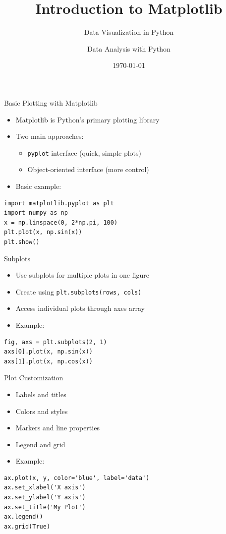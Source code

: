 \documentclass{beamer}
\title{Introduction to Matplotlib}
\subtitle{Data Visualization in Python}
\author{Data Analysis with Python}
\date{\today}
\begin{document}
\begin{frame}
    \titlepage
\end{frame}

\begin{frame}[fragile]{Basic Plotting with Matplotlib}
    \begin{itemize}
        \item Matplotlib is Python's primary plotting library
        \item Two main approaches:
        \begin{itemize}
            \item \texttt{pyplot} interface (quick, simple plots)
            \item Object-oriented interface (more control)
        \end{itemize}
        \item Basic example:
    \end{itemize}
\begin{lstlisting}
import matplotlib.pyplot as plt
import numpy as np
x = np.linspace(0, 2*np.pi, 100)
plt.plot(x, np.sin(x))
plt.show()
\end{lstlisting}
\end{frame}

\begin{frame}[fragile]{Subplots}
    \begin{itemize}
        \item Use subplots for multiple plots in one figure
        \item Create using \texttt{plt.subplots(rows, cols)}
        \item Access individual plots through axes array
        \item Example:
    \end{itemize}
\begin{lstlisting}
fig, axs = plt.subplots(2, 1)
axs[0].plot(x, np.sin(x))
axs[1].plot(x, np.cos(x))
\end{lstlisting}
\end{frame}

\begin{frame}[fragile]{Plot Customization}
    \begin{itemize}
        \item Labels and titles
        \item Colors and styles
        \item Markers and line properties
        \item Legend and grid
        \item Example:
    \end{itemize}

\begin{lstlisting}
ax.plot(x, y, color='blue', label='data')
ax.set_xlabel('X axis')
ax.set_ylabel('Y axis')
ax.set_title('My Plot')
ax.legend()
ax.grid(True)
\end{lstlisting}
\end{frame}
\end{document}
